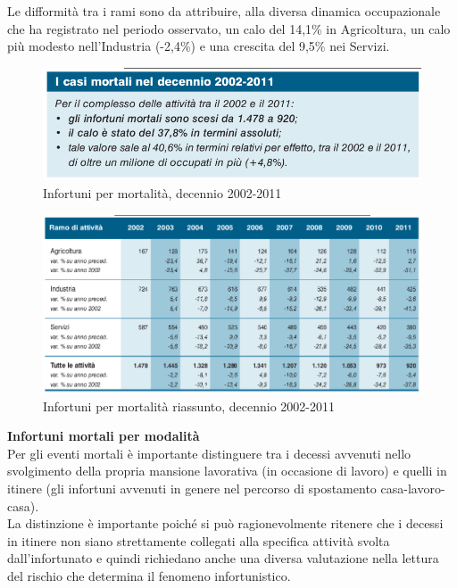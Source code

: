Le difformità tra i rami sono da attribuire, alla diversa dinamica occupazionale che ha registrato nel periodo osservato, un calo del 14,1\% in Agricoltura, un calo più modesto nell'Industria (-2,4\%) e una crescita del 9,5\% nei Servizi.



\begin{figure}[H]
\centering
\includegraphics[scale=0.5]{images/cap4/analisiDiMercato/infortuniDecennioPerMortalita1}
\caption{Infortuni per mortalità, decennio 2002-2011}
\end{figure}

\begin{figure}[H]
\centering
\includegraphics[scale=0.55]{images/cap4/analisiDiMercato/infortuniDecennioPerMortalita2}
\caption{Infortuni per mortalità riassunto, decennio 2002-2011}
\end{figure}





\textbf{Infortuni mortali per modalità}\\
Per gli eventi mortali è importante distinguere tra i decessi avvenuti nello svolgimento della propria mansione lavorativa (in occasione di lavoro) e quelli in itinere (gli infortuni avvenuti in genere nel percorso di spostamento casa-lavoro-casa).\\
La distinzione è importante poiché si può ragionevolmente ritenere che i decessi in itinere non siano strettamente collegati alla specifica attività svolta dall'infortunato e quindi richiedano anche una diversa valutazione nella lettura del rischio che determina il
fenomeno infortunistico.



